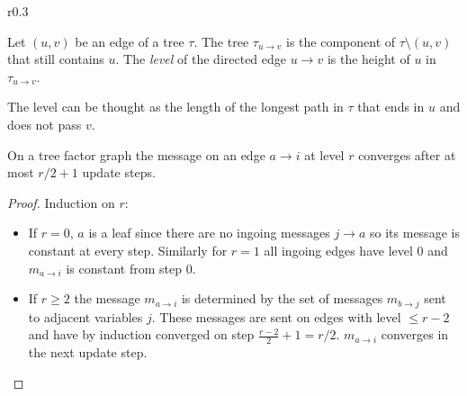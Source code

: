 \begin{wrapfigure}{r}{0.3\textwidth}

\end{wrapfigure}
\begin{definition} Let $(u, v)$ be an edge of a tree $\tau$. \newline
The tree $\tau_{u \rightarrow v}$ is the component of $\tau \setminus (u, v)$ that still contains $u$. The \emph{level} of the directed edge $u \rightarrow v$ is the height of $u$ in $\tau_{u \rightarrow v}$. 
\end{definition}
The level can be thought as the length of the longest path in $\tau$ that ends in $u$ and does not pass $v$.
\begin{lemma}\cite{survprob}
On a tree factor graph the message on an edge $a \rightarrow i$ at level $r$ converges after at most $r/2 + 1$ update steps.
\begin{proof} Induction on $r$:
\begin{itemize}
\item[] If $r = 0$, $a$ is a leaf since there are no ingoing messages $j \rightarrow a$ so its message is constant at every step. \newline
Similarly for $r = 1$ all ingoing edges have level $0$ and $m_{a \rightarrow i}$ is constant from step $0$.
\item[] If $r \geq 2$ the message $m_{a \rightarrow i}$ is determined by the set of messages $m_{b \rightarrow j}$ sent to adjacent variables $j$. These messages are sent on edges with level $\leq r-2$ and have by induction converged on step $\frac{r-2}{2} + 1 = r / 2$. $m_{a \rightarrow i}$ converges in the next update step.
\end{itemize}
\end{proof}
\end{lemma}

